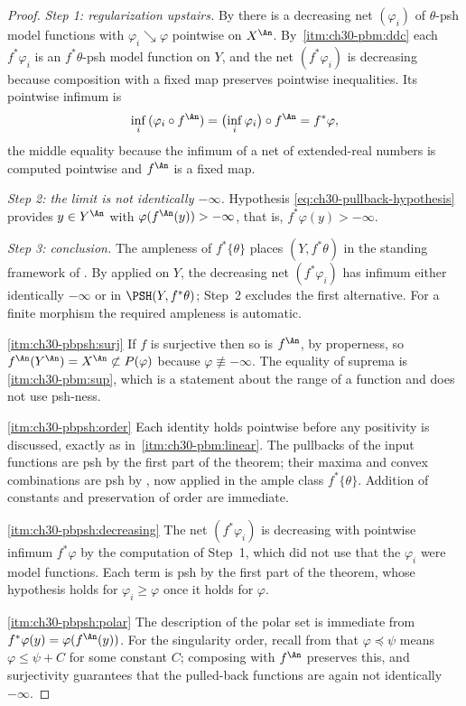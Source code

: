\begin{proof}
\emph{Step 1: regularization upstairs.}  By
 there is a decreasing net
$(\varphi_i)$ of $\theta$-psh model functions with
$\varphi_i\searrow\varphi$ pointwise on $X^{\An}$.  By
\,\cref{itm:ch30-pbm:ddc} each
$f^*\varphi_i$ is an $f^*\theta$-psh model function on $Y$, and the
net $(f^*\varphi_i)$ is decreasing because composition with a fixed map
preserves pointwise inequalities.  Its pointwise infimum is
\[
 \inf_i\,(\varphi_i\circ f^{\An})
 =\bigl(\inf_i\varphi_i\bigr)\circ f^{\An}
 =f^*\varphi,
\]
the middle equality because the infimum of a net of extended-real numbers is
computed pointwise and $f^{\An}$ is a fixed map.

\emph{Step 2: the limit is not identically $-\infty$.}  Hypothesis
\eqref{eq:ch30-pullback-hypothesis} provides $y\in Y^{\An}$ with
$\varphi(f^{\An}(y))>-\infty$, that is, $f^*\varphi(y)>-\infty$.

\emph{Step 3: conclusion.}  The ampleness of $f^*\{\theta\}$ places
$(Y,f^*\theta)$ in the standing framework of .
By  applied on $Y$, the decreasing net
$(f^*\varphi_i)$ has infimum either identically $-\infty$ or in
$\PSH(Y,f^*\theta)$; Step~2 excludes the first alternative.  For a finite
morphism the required ampleness is automatic.

\cref{itm:ch30-pbpsh:surj}  If $f$ is surjective then so is $f^{\An}$, by
properness, so $f^{\An}(Y^{\An})=X^{\An}\not\subset P(\varphi)$ because
$\varphi\not\equiv-\infty$.  The equality of suprema is
\,\cref{itm:ch30-pbm:sup}, which is a
statement about the range of a function and does not use psh-ness.

\cref{itm:ch30-pbpsh:order}  Each identity holds pointwise before any
positivity is discussed, exactly as in
\,\cref{itm:ch30-pbm:linear}.  The
pullbacks of the input functions are psh by the first part of the theorem;
their maxima and convex combinations are psh by
, now applied in the ample class
$f^*\{\theta\}$.  Addition of constants and preservation of order are
immediate.

\cref{itm:ch30-pbpsh:decreasing}  The net $(f^*\varphi_i)$ is decreasing
with pointwise infimum $f^*\varphi$ by the computation of Step~1, which
did not use that the $\varphi_i$ were model functions.  Each term is psh
by the first part of the theorem, whose hypothesis holds for
$\varphi_i\geq\varphi$ once it holds for $\varphi$.

\cref{itm:ch30-pbpsh:polar}  The description of the polar set is immediate
from $f^*\varphi(y)=\varphi(f^{\An}(y))$.  For the singularity order,
recall from  that $\varphi\preceq\psi$
means $\varphi\leq\psi+C$ for some constant $C$; composing with
$f^{\An}$ preserves this, and surjectivity guarantees that the pulled-back
functions are again not identically $-\infty$.
\end{proof}


